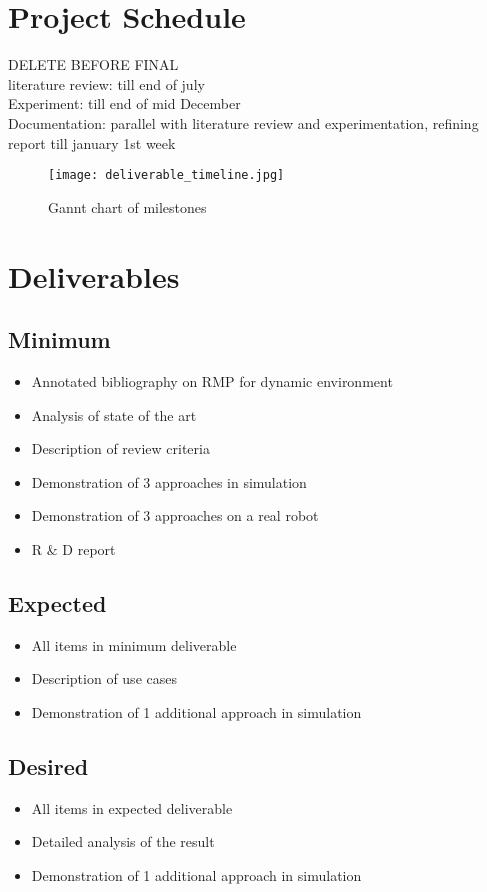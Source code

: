 \documentclass[rnd]{mas_proposal}
\begin{document}
\section{Project Schedule}

DELETE BEFORE FINAL\\
literature review: till end of july\\
Experiment: till end of mid December\\
Documentation: parallel with literature review and experimentation, refining report till january 1st week \\

\begin{figure}[h!]
    \texttt{[image: deliverable\_timeline.jpg]}
    \caption{Gannt chart of milestones}
    \label{}
\end{figure}

\section{Deliverables}
\subsection{Minimum}

\begin{itemize}
    \item Annotated bibliography on RMP for dynamic environment
    \item Analysis of state of the art
    \item Description of review criteria
    \item Demonstration of 3 approaches in simulation
    \item Demonstration of 3 approaches on a real robot
    \item R \& D report 
\end{itemize}

\subsection{Expected}
\begin{itemize}
    \item All items in minimum deliverable
    \item Description of use cases
    \item Demonstration of 1 additional approach in simulation
\end{itemize}

\subsection{Desired}
\begin{itemize}
    \item All items in expected deliverable
    \item Detailed analysis of the result
    \item Demonstration of 1 additional approach in simulation
\end{itemize}



\end{document}
